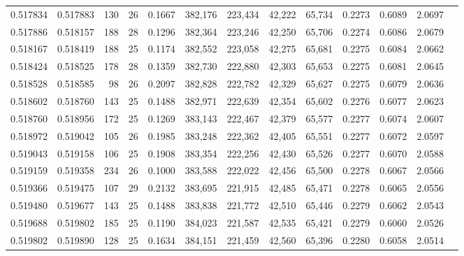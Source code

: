 \begin{tabular}{rrrrrrrrrrrrr}
0.517834 & 0.517883 &   130 &  26 &                                     0.1667 & 382,176 & 223,434 &  42,222 &  65,734 & 0.2273 & 0.6089 & 2.0697 \\
0.517886 & 0.518157 &   188 &  28 &                                     0.1296 & 382,364 & 223,246 &  42,250 &  65,706 & 0.2274 & 0.6086 & 2.0679 \\
0.518167 & 0.518419 &   188 &  25 &                                     0.1174 & 382,552 & 223,058 &  42,275 &  65,681 & 0.2275 & 0.6084 & 2.0662 \\
0.518424 & 0.518525 &   178 &  28 &                                     0.1359 & 382,730 & 222,880 &  42,303 &  65,653 & 0.2275 & 0.6081 & 2.0645 \\
0.518528 & 0.518585 &    98 &  26 &                                     0.2097 & 382,828 & 222,782 &  42,329 &  65,627 & 0.2275 & 0.6079 & 2.0636 \\
0.518602 & 0.518760 &   143 &  25 &                                     0.1488 & 382,971 & 222,639 &  42,354 &  65,602 & 0.2276 & 0.6077 & 2.0623 \\
0.518760 & 0.518956 &   172 &  25 &                                     0.1269 & 383,143 & 222,467 &  42,379 &  65,577 & 0.2277 & 0.6074 & 2.0607 \\
0.518972 & 0.519042 &   105 &  26 &                                     0.1985 & 383,248 & 222,362 &  42,405 &  65,551 & 0.2277 & 0.6072 & 2.0597 \\
0.519043 & 0.519158 &   106 &  25 &                                     0.1908 & 383,354 & 222,256 &  42,430 &  65,526 & 0.2277 & 0.6070 & 2.0588 \\
0.519159 & 0.519358 &   234 &  26 &                                     0.1000 & 383,588 & 222,022 &  42,456 &  65,500 & 0.2278 & 0.6067 & 2.0566 \\
0.519366 & 0.519475 &   107 &  29 &                                     0.2132 & 383,695 & 221,915 &  42,485 &  65,471 & 0.2278 & 0.6065 & 2.0556 \\
0.519480 & 0.519677 &   143 &  25 &                                     0.1488 & 383,838 & 221,772 &  42,510 &  65,446 & 0.2279 & 0.6062 & 2.0543 \\
0.519688 & 0.519802 &   185 &  25 &                                     0.1190 & 384,023 & 221,587 &  42,535 &  65,421 & 0.2279 & 0.6060 & 2.0526 \\
0.519802 & 0.519890 &   128 &  25 &                                     0.1634 & 384,151 & 221,459 &  42,560 &  65,396 & 0.2280 & 0.6058 & 2.0514 \\

\end{tabular}
